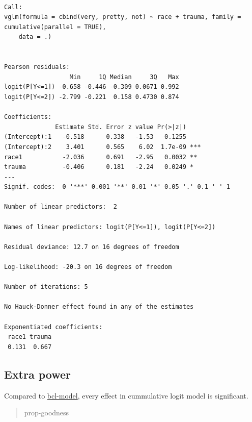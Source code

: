 \documentclass[]{book}
\newenvironment{Shaded}{\begin{snugshade}}{\end{snugshade}}
\newcommand{\CommentTok}[1]{\textcolor[rgb]{0.56,0.35,0.01}{\textit{#1}}}
\newcommand{\DataTypeTok}[1]{\textcolor[rgb]{0.13,0.29,0.53}{#1}}
\newcommand{\DecValTok}[1]{\textcolor[rgb]{0.00,0.00,0.81}{#1}}
\newcommand{\KeywordTok}[1]{\textcolor[rgb]{0.13,0.29,0.53}{\textbf{#1}}}
\newcommand{\NormalTok}[1]{#1}
\newcommand{\OperatorTok}[1]{\textcolor[rgb]{0.81,0.36,0.00}{\textbf{#1}}}
\newcommand{\OtherTok}[1]{\textcolor[rgb]{0.56,0.35,0.01}{#1}}
\newcommand{\StringTok}[1]{\textcolor[rgb]{0.31,0.60,0.02}{#1}}
\begin{document}
\begin{verbatim}

Call:
vglm(formula = cbind(very, pretty, not) ~ race + trauma, family = cumulative(parallel = TRUE), 
    data = .)


Pearson residuals:
                  Min     1Q Median     3Q   Max
logit(P[Y<=1]) -0.658 -0.446 -0.309 0.0671 0.992
logit(P[Y<=2]) -2.799 -0.221  0.158 0.4730 0.874

Coefficients: 
              Estimate Std. Error z value Pr(>|z|)    
(Intercept):1   -0.518      0.338   -1.53   0.1255    
(Intercept):2    3.401      0.565    6.02  1.7e-09 ***
race1           -2.036      0.691   -2.95   0.0032 ** 
trauma          -0.406      0.181   -2.24   0.0249 *  
---
Signif. codes:  0 '***' 0.001 '**' 0.01 '*' 0.05 '.' 0.1 ' ' 1

Number of linear predictors:  2 

Names of linear predictors: logit(P[Y<=1]), logit(P[Y<=2])

Residual deviance: 12.7 on 16 degrees of freedom

Log-likelihood: -20.3 on 16 degrees of freedom

Number of iterations: 5 

No Hauck-Donner effect found in any of the estimates

Exponentiated coefficients:
 race1 trauma 
 0.131  0.667 
\end{verbatim}

\hypertarget{extra-power}{%
\subsection{Extra power}\label{extra-power}}

Compared to \protect\hyperlink{bcl-model}{bcl-model}, every effect in cummulative logit model is significant.

\begin{quote}
prop-goodness
\end{quote}

\begin{Shaded}
\end{Shaded}
\end{document}
